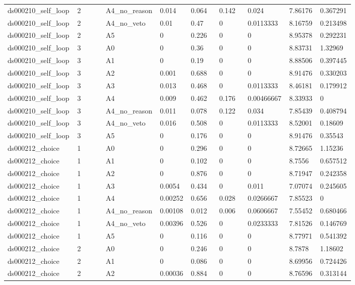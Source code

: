 \documentclass[11pt]{article}
\begin{document}
\begin{landscape}
\begin{longtable}{@{}L{0.120\linewidth}L{0.085\linewidth}L{0.085\linewidth}L{0.085\linewidth}L{0.085\linewidth}L{0.085\linewidth}L{0.085\linewidth}L{0.085\linewidth}L{0.085\linewidth}@{}}
ds000210\_self\_loop & 2 & A4\_no\_reason & 0.014 & 0.064 & 0.142 & 0.024 & 7.86176 & 0.367291 \\
ds000210\_self\_loop & 2 & A4\_no\_veto & 0.01 & 0.47 & 0 & 0.0113333 & 8.16759 & 0.213498 \\
ds000210\_self\_loop & 2 & A5 & 0 & 0.226 & 0 & 0 & 8.95378 & 0.292231 \\
ds000210\_self\_loop & 3 & A0 & 0 & 0.36 & 0 & 0 & 8.83731 & 1.32969 \\
ds000210\_self\_loop & 3 & A1 & 0 & 0.19 & 0 & 0 & 8.88506 & 0.397445 \\
ds000210\_self\_loop & 3 & A2 & 0.001 & 0.688 & 0 & 0 & 8.91476 & 0.330203 \\
ds000210\_self\_loop & 3 & A3 & 0.013 & 0.468 & 0 & 0.0113333 & 8.46181 & 0.179912 \\
ds000210\_self\_loop & 3 & A4 & 0.009 & 0.462 & 0.176 & 0.00466667 & 8.33933 & 0 \\
ds000210\_self\_loop & 3 & A4\_no\_reason & 0.011 & 0.078 & 0.122 & 0.034 & 7.85439 & 0.408794 \\
ds000210\_self\_loop & 3 & A4\_no\_veto & 0.016 & 0.508 & 0 & 0.0113333 & 8.52001 & 0.18609 \\
ds000210\_self\_loop & 3 & A5 & 0 & 0.176 & 0 & 0 & 8.91476 & 0.35543 \\
ds000212\_choice & 1 & A0 & 0 & 0.296 & 0 & 0 & 8.72665 & 1.15236 \\
ds000212\_choice & 1 & A1 & 0 & 0.102 & 0 & 0 & 8.7556 & 0.657512 \\
ds000212\_choice & 1 & A2 & 0 & 0.876 & 0 & 0 & 8.71947 & 0.242358 \\
ds000212\_choice & 1 & A3 & 0.0054 & 0.434 & 0 & 0.011 & 7.07074 & 0.245605 \\
ds000212\_choice & 1 & A4 & 0.00252 & 0.656 & 0.028 & 0.0266667 & 7.85523 & 0 \\
ds000212\_choice & 1 & A4\_no\_reason & 0.00108 & 0.012 & 0.006 & 0.0606667 & 7.55452 & 0.680466 \\
ds000212\_choice & 1 & A4\_no\_veto & 0.00396 & 0.526 & 0 & 0.0233333 & 7.81526 & 0.146769 \\
ds000212\_choice & 1 & A5 & 0 & 0.116 & 0 & 0 & 8.77971 & 0.541392 \\
ds000212\_choice & 2 & A0 & 0 & 0.246 & 0 & 0 & 8.7878 & 1.18602 \\
ds000212\_choice & 2 & A1 & 0 & 0.086 & 0 & 0 & 8.69956 & 0.724426 \\
ds000212\_choice & 2 & A2 & 0.00036 & 0.884 & 0 & 0 & 8.76596 & 0.313144 \\

\end{longtable}
\end{landscape}
\end{document}
